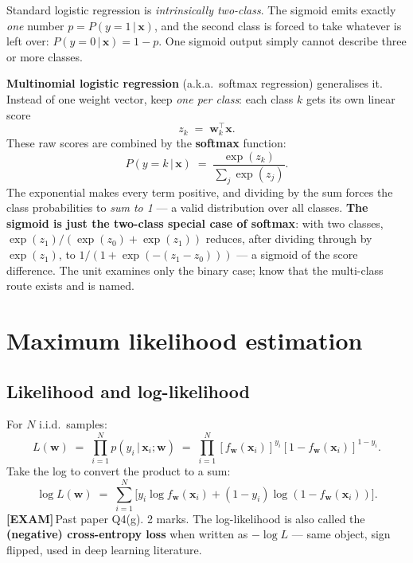 \documentclass[11pt, a4paper]{article}
\newcommand{\examflag}{\textcolor{tipBd}{\textbf{[EXAM]}}\,}
\begin{document}
\begin{notebox}
Standard logistic regression is \emph{intrinsically two-class}. The sigmoid emits exactly \emph{one} number $p = P(y=1\,|\,\mathbf{x})$, and the second class is forced to take whatever is left over: $P(y=0\,|\,\mathbf{x}) = 1-p$. One sigmoid output simply cannot describe three or more classes.

\textbf{Multinomial logistic regression} (a.k.a.\ softmax regression) generalises it. Instead of one weight vector, keep \emph{one per class}: each class $k$ gets its own linear score
\[
z_k \;=\; \mathbf{w}_k^\top\mathbf{x}.
\]
These raw scores are combined by the \textbf{softmax} function:
\[
P(y = k\,|\,\mathbf{x}) \;=\; \frac{\exp(z_k)}{\sum_{j}\exp(z_j)}.
\]
The exponential makes every term positive, and dividing by the sum forces the class probabilities to \emph{sum to 1} --- a valid distribution over all classes. \textbf{The sigmoid is just the two-class special case of softmax}: with two classes, $\exp(z_1)/(\exp(z_0)+\exp(z_1))$ reduces, after dividing through by $\exp(z_1)$, to $1/(1+\exp(-(z_1-z_0)))$ --- a sigmoid of the score difference. The unit examines only the binary case; know that the multi-class route exists and is named.
\end{notebox}

\section{Maximum likelihood estimation}

\subsection{Likelihood and log-likelihood}

For $N$ i.i.d.\ samples:
\[
L(\mathbf{w}) \;=\; \prod_{i=1}^N p(y_i\,|\,\mathbf{x}_i;\mathbf{w}) \;=\; \prod_{i=1}^N [f_\mathbf{w}(\mathbf{x}_i)]^{y_i}[1-f_\mathbf{w}(\mathbf{x}_i)]^{1-y_i}.
\]
Take the log to convert the product to a sum:
\[
\boxed{\;\log L(\mathbf{w}) \;=\; \sum_{i=1}^N \big[y_i\log f_\mathbf{w}(\mathbf{x}_i) + (1-y_i)\log(1-f_\mathbf{w}(\mathbf{x}_i))\big].\;}
\]
\examflag{}Past paper Q4(g). 2 marks. The log-likelihood is also called the \textbf{(negative) cross-entropy loss} when written as $-\log L$ — same object, sign flipped, used in deep learning literature.
\end{document}
